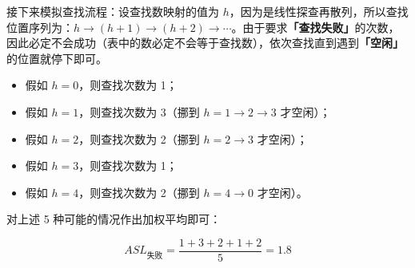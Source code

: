 \documentclass[UTF8]{ctexart}
\newcommand\Emph[1]{\colorbox{green!10}{\textcolor{green!30!black}{\textbf{#1}}}}
\begin{document}
接下来模拟查找流程：设查找数映射的值为 $h$，因为是线性探查再散列，所以查找位置序列为：$h \to (h+1)\to (h+2)\to \cdots$。由于要求\Emph{「查找失败」}的次数，因此必定不会成功（表中的数必定不会等于查找数），依次查找直到遇到\Emph{「空闲」}的位置就停下即可。

\begin{itemize}[itemsep=0pt,parsep=0pt]
  \item 假如 $h=0$，则查找次数为 1；
  \item 假如 $h=1$，则查找次数为 3（挪到 $h=1\to 2\to 3$ 才空闲）；
  \item 假如 $h=2$，则查找次数为 2（挪到 $h=2\to 3$ 才空闲）；
  \item 假如 $h=3$，则查找次数为 1；
  \item 假如 $h=4$，则查找次数为 2（挪到 $h=4\to 0$ 才空闲）。
\end{itemize}

对上述 5 种可能的情况作出加权平均即可：

\begin{equation*}
   ASL_{\text{失败}} = \dfrac{1+3+2+1+2}{5} = 1.8
\end{equation*}

\newpage
{}
\BgThispage
\end{document}
